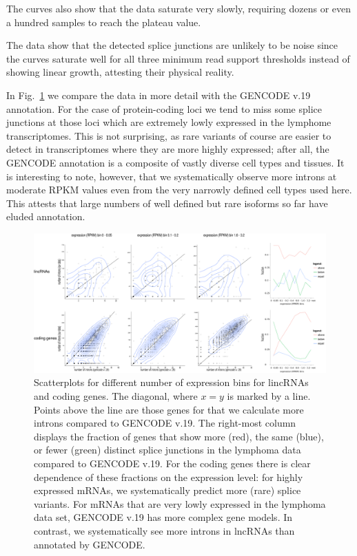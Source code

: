 \documentclass[ncrna,article,submit,moreauthors,pdftex,10pt,a4paper]{mdpi}
\begin{document}
The curves also show that the data saturate very slowly, requiring dozens
or even a hundred samples to reach the plateau value. 

The data show that the detected splice junctions are unlikely to be noise since the curves saturate well for all three minimum read support thresholds instead of showing linear growth, attesting their physical reality.

In Fig.~\ref{fig:compare} we compare the data in more detail with the
GENCODE v.19 annotation. For the case of protein-coding loci we tend to
miss some splice junctions at those loci which are extremely lowly expressed in
the lymphome transcriptomes. This is not surprising, as rare variants of
course are easier to detect in transcriptomes where they are more highly
expressed; after all, the GENCODE annotation is a composite of vastly
diverse cell types and tissues. It is interesting to note, however, that we
systematically observe more introns at moderate RPKM values even from the
very narrowly defined cell types used here. This attests that large numbers
of well defined but rare isoforms so far have eluded annotation.

\begin{figure}[t]
  \begin{center}
    \includegraphics[width=\textwidth]{Fig1}
  \end{center}
  \caption{Scatterplots for different number of expression bins for
    lincRNAs and coding genes.  The diagonal, where $x=y$ is marked by a
    line. Points above the line are those genes for that we calculate more
    introns compared to GENCODE v.19.  The right-most column displays the
    fraction of genes that show more (red), the same (blue), or fewer
    (green) distinct splice junctions in the lymphoma data compared to
    GENCODE v.19.  For the coding genes there is clear dependence of these
    fractions on the expression level: for highly expressed mRNAs, we
    systematically predict more (rare) splice variants. For mRNAs that are
    very lowly expressed in the lymphoma data set, GENCODE v.19 has more
    complex gene models. In contrast, we systematically see more introns in
    lncRNAs than annotated by GENCODE.}
  \label{fig:compare}
\end{figure}
\end{document}

